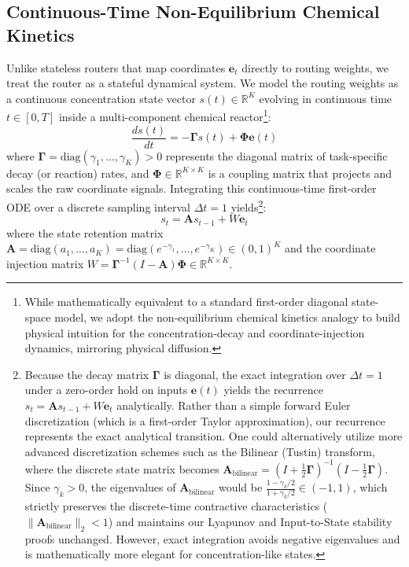 \subsection{Continuous-Time Non-Equilibrium Chemical Kinetics}
\label{sec:chemical_kinetics}
Unlike stateless routers that map coordinates $\mathbf{e}_t$ directly to routing weights, we treat the router as a stateful dynamical system. We model the routing weights as a continuous concentration state vector $s(t) \in \mathbb{R}^K$ evolving in continuous time $t \in [0, T]$ inside a multi-component chemical reactor\footnote{While mathematically equivalent to a standard first-order diagonal state-space model, we adopt the non-equilibrium chemical kinetics analogy to build physical intuition for the concentration-decay and coordinate-injection dynamics, mirroring physical diffusion.}:
\begin{equation}
    \frac{ds(t)}{dt} = - \mathbf{\Gamma} s(t) + \mathbf{\Phi} \mathbf{e}(t)
\end{equation}
where $\mathbf{\Gamma} = \text{diag}(\gamma_1, \dots, \gamma_K) > 0$ represents the diagonal matrix of task-specific decay (or reaction) rates, and $\mathbf{\Phi} \in \mathbb{R}^{K \times K}$ is a coupling matrix that projects and scales the raw coordinate signals. Integrating this continuous-time first-order ODE over a discrete sampling interval $\Delta t = 1$ yields\footnote{Because the decay matrix $\mathbf{\Gamma}$ is diagonal, the exact integration over $\Delta t = 1$ under a zero-order hold on inputs $\mathbf{e}(t)$ yields the recurrence $s_t = \mathbf{A} s_{t-1} + W \mathbf{e}_t$ analytically. Rather than a simple forward Euler discretization (which is a first-order Taylor approximation), our recurrence represents the exact analytical transition. One could alternatively utilize more advanced discretization schemes such as the Bilinear (Tustin) transform, where the discrete state matrix becomes $\mathbf{A}_{\text{bilinear}} = (I + \frac{1}{2}\mathbf{\Gamma})^{-1}(I - \frac{1}{2}\mathbf{\Gamma})$. Since $\gamma_k > 0$, the eigenvalues of $\mathbf{A}_{\text{bilinear}}$ would be $\frac{1 - \gamma_k/2}{1 + \gamma_k/2} \in (-1, 1)$, which strictly preserves the discrete-time contractive characteristics ($\|\mathbf{A}_{\text{bilinear}}\|_2 < 1$) and maintains our Lyapunov and Input-to-State stability proofs unchanged. However, exact integration avoids negative eigenvalues and is mathematically more elegant for concentration-like states.}:
\begin{equation}
    s_t = \mathbf{A} s_{t-1} + W \mathbf{e}_t
\end{equation}
where the state retention matrix $\mathbf{A} = \text{diag}(a_1, \dots, a_K) = \text{diag}(e^{-\gamma_1}, \dots, e^{-\gamma_K}) \in (0, 1)^K$ and the coordinate injection matrix $W = \mathbf{\Gamma}^{-1}(I - \mathbf{A})\mathbf{\Phi} \in \mathbb{R}^{K \times K}$.

